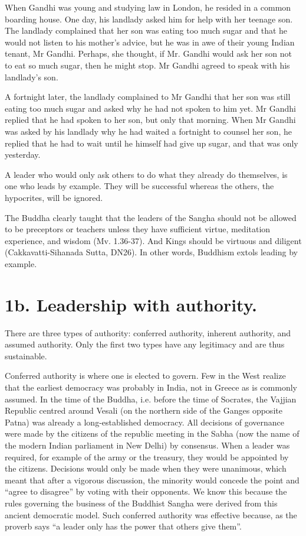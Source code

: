 \documentclass[12pt, openany]{book}
\begin{document}
When Gandhi was young and studying law in London, he resided in a common boarding house. One day, his landlady asked him for help with her teenage son. The landlady complained that her son was eating too much sugar and that he would not listen to his mother’s advice, but he was in awe of their young Indian tenant, Mr Gandhi. Perhaps, she thought, if Mr. Gandhi would ask her son not to eat so much sugar, then he might stop. Mr Gandhi agreed to speak with his landlady’s son.

A fortnight later, the landlady complained to Mr Gandhi that her son was still eating too much sugar and asked why he had not spoken to him yet. Mr Gandhi replied that he had spoken to her son, but only that morning. When Mr Gandhi was asked by his landlady why he had waited a fortnight to counsel her son, he replied that he had to wait until he himself had give up sugar, and that was only yesterday.

A leader who would only ask others to do what they already do themselves, is one who leads by example. They will be successful whereas the others, the hypocrites, will be ignored.

The Buddha clearly taught that the leaders of the Sangha should not be allowed to be preceptors or teachers unless they have sufficient virtue, meditation experience, and wisdom (Mv. 1.36-37). And Kings should be virtuous and diligent (Cakkavatti-Sihanada Sutta, DN26). In other words, Buddhism extols leading by example.


\section{1b. Leadership with authority.}

There are three types of authority: conferred authority, inherent authority, and assumed authority. Only the first two types have any legitimacy and are thus sustainable.

Conferred authority is where one is elected to govern. Few in the West realize that the earliest democracy was probably in India, not in Greece as is commonly assumed. In the time of the Buddha, i.e. before the time of Socrates, the Vajjian Republic centred around Vesali (on the northern side of the Ganges opposite Patna) was already a long-established democracy. All decisions of governance were made by the citizens of the republic meeting in the Sabha (now the name of the modern Indian parliament in New Delhi) by consensus. When a leader was required, for example of the army or the treasury, they would be appointed by the citizens. Decisions would only be made when they were unanimous, which meant that after a vigorous discussion, the minority would concede the point and “agree to disagree” by voting with their opponents. We know this because the rules governing the business of the Buddhist Sangha were derived from this ancient democratic model. Such conferred authority was effective because, as the proverb says “a leader only has the power that others give them”.
\end{document}

